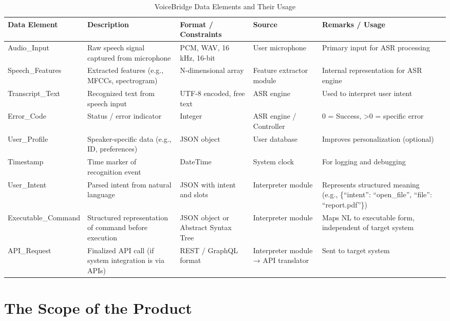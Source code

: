 \documentclass[12pt]{article}
\begin{document}
\begin{table}[H]
\centering
\begin{tabularx}{\textwidth}{p{3cm} X X X X X}
\toprule
\textbf{Data Element} & \textbf{Description} & \textbf{Format / Constraints} & \textbf{Source} & \textbf{Remarks / Usage} \\
\midrule
Audio\_Input & Raw speech signal captured from microphone &  PCM, WAV, 16 kHz, 16-bit & User microphone & Primary input for ASR processing \\
Speech\_Features & Extracted features (e.g., MFCCs, spectrogram)  & N-dimensional array & Feature extractor module & Internal representation for ASR engine \\
Transcript\_Text & Recognized text from speech input & UTF-8 encoded, free text & ASR engine & Used to interpret user intent \\
Error\_Code & Status / error indicator & Integer &  ASR engine / Controller & 0 = Success, >0 = specific error \\
User\_Profile & Speaker-specific data (e.g., ID, preferences)  & JSON object & User database & Improves personalization (optional) \\
Timestamp & Time marker of recognition event & DateTime  & System clock & For logging and debugging \\
User\_Intent & Parsed intent from natural language & JSON with intent and slots & Interpreter module & Represents structured meaning (e.g., \{“intent”: “open\_file”, “file”: “report.pdf”\}) \\
Executable\_Command & Structured representation of command before execution & JSON object or Abstract Syntax Tree & Interpreter module & Maps NL to executable form, independent of target system \\
API\_Request & Finalized API call (if system integration is via APIs)  & REST / GraphQL format & Interpreter module → API translator & Sent to target system \\
\bottomrule
\end{tabularx}
\caption{VoiceBridge Data Elements and Their Usage}
\label{tab:voicebridge-data-elements}
\end{table}


\section{The Scope of the Product}
\end{document}
